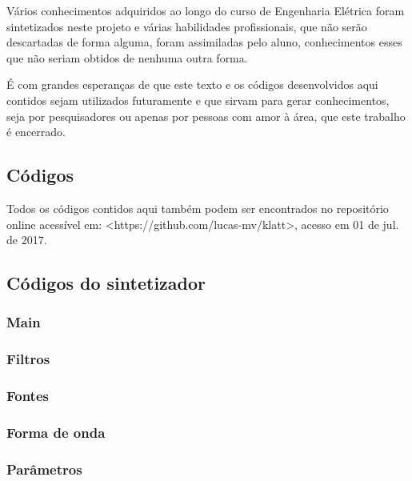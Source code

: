 \documentclass[
  12pt,       
  openright,      
  twoside,      
  a4paper,      
  english,      
  french,       
  spanish,      
  brazil,     
  ]{abntex2}
\begin{document}
Vários conhecimentos adquiridos ao longo do curso de Engenharia Elétrica foram sintetizados neste projeto e várias habilidades profissionais, que não serão descartadas de forma alguma, foram assimiladas pelo aluno, conhecimentos esses que não seriam obtidos de nenhuma outra forma.

É com grandes esperanças de que este texto e os códigos desenvolvidos aqui contidos sejam utilizados futuramente e que sirvam para gerar conhecimentos, seja por pesquisadores ou apenas por pessoas com amor à área, que este trabalho é encerrado.

\postextual



\begin{apendicesenv}
\partapendices

\chapter{Códigos}
\label{sec:apendice1}

Todos os códigos contidos aqui também podem ser encontrados no repositório online acessível em: <https://github.com/lucas-mv/klatt>, acesso em 01 de jul. de 2017.

\section{Códigos do sintetizador}
\subsection{Main}

\subsection{Filtros}

\subsection{Fontes}

\subsection{Forma de onda}

\subsection{Parâmetros}


\end{apendicesenv}
\end{document}
